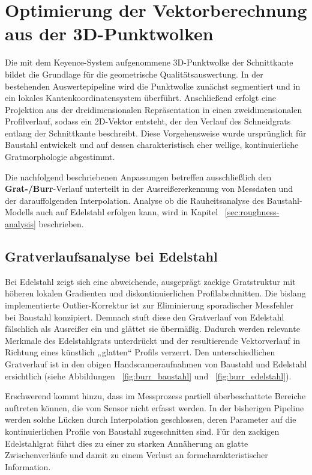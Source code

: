\chapter{Optimierung der Vektorberechnung aus der 3D-Punktwolken}
\label{chap:3d-punktwolken-optimierung}

Die mit dem Keyence-System aufgenommene 3D-Punktwolke der Schnittkante bildet die Grundlage für die geometrische Qualitätsauswertung. In der bestehenden Auswertepipeline wird die Punktwolke zunächst segmentiert und in ein lokales Kantenkoordinatensystem überführt. Anschließend erfolgt eine Projektion aus der dreidimensionalen Repräsentation in einen zweidimensionalen Profilverlauf, sodass ein 2D-Vektor entsteht, der den Verlauf des Schneidgrats entlang der Schnittkante beschreibt. Diese Vorgehensweise wurde ursprünglich für Baustahl entwickelt und auf dessen charakteristisch eher wellige, kontinuierliche Gratmorphologie abgestimmt.

Die nachfolgend beschriebenen Anpassungen betreffen ausschließlich den \textbf{Grat-/Burr}-Verlauf unterteilt in der Ausreißererkennung von Messdaten und der darauffolgenden Interpolation. Analyse ob die Rauheitsanalyse des Baustahl-Modells auch auf Edelstahl erfolgen kann, wird in Kapitel ~\ref{sec:roughness-analysis} beschrieben.

\section{Gratverlaufsanalyse bei Edelstahl}

Bei Edelstahl zeigt sich eine abweichende, ausgeprägt zackige Gratstruktur mit höheren lokalen Gradienten und diskontinuierlichen Profilabschnitten. Die bislang implementierte Outlier-Korrektur ist zur Eliminierung sporadischer Messfehler bei Baustahl konzipiert. Demnach stuft diese den Gratverlauf von Edelstahl fälschlich als Ausreißer ein und glättet sie übermäßig. Dadurch werden relevante Merkmale des Edelstahlgrats unterdrückt und der resultierende Vektorverlauf in Richtung eines künstlich „glatten“ Profils verzerrt. Den unterschiedlichen Gratverlauf ist in den obigen Handscanneraufnahmen von Baustahl und Edelstahl ersichtlich (siehe Abbildungen ~\ref{fig:burr_baustahl} und ~\ref{fig:burr_edelstahl}).

Erschwerend kommt hinzu, dass im Messprozess partiell überbeschattete Bereiche auftreten können, die vom Sensor nicht erfasst werden. In der bisherigen Pipeline werden solche Lücken durch Interpolation geschlossen, deren Parameter auf die kontinuierlichen Profile von Baustahl zugeschnitten sind. Für den zackigen Edelstahlgrat führt dies zu einer zu starken Annäherung an glatte Zwischenverläufe und damit zu einem Verlust an formcharakteristischer Information.

